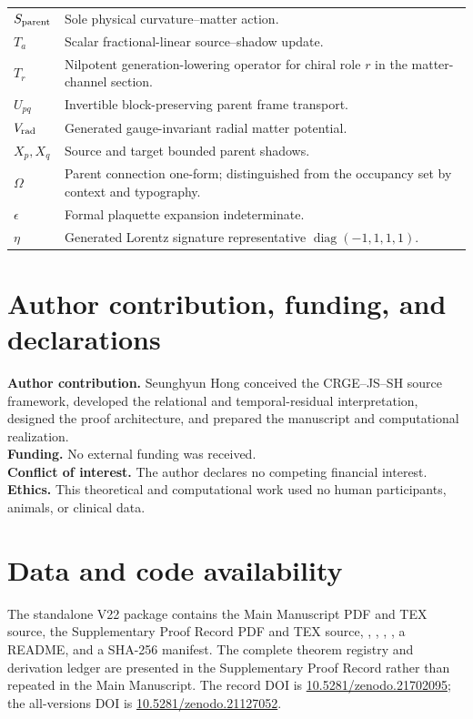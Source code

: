 \documentclass[11pt]{article}
\numberwithin{equation}{section}
\theoremstyle{remark}
\newcommand{\doi}[1]{\href{https://doi.org/#1}{#1}}
\begin{document}
\begin{longtable}{p{2.4cm}p{11.8cm}}
$S_{\rm parent}$&Sole physical curvature--matter action.\\
$T_a$&Scalar fractional-linear source--shadow update.\\
$T_r$&Nilpotent generation-lowering operator for chiral role $r$ in the matter-channel section.\\
$U_{pq}$&Invertible block-preserving parent frame transport.\\
$V_{\rm rad}$&Generated gauge-invariant radial matter potential.\\
$X_p,X_q$&Source and target bounded parent shadows.\\
$\Omega$&Parent connection one-form; distinguished from the occupancy set by context and typography.\\
$\epsilon$&Formal plaquette expansion indeterminate.\\
$\eta$&Generated Lorentz signature representative $\operatorname{diag}(-1,1,1,1)$.\\
\bottomrule
\end{longtable}

\section{Author contribution, funding, and declarations}
\textbf{Author contribution.} Seunghyun Hong conceived the CRGE--JS--SH source framework, developed the relational and temporal-residual interpretation, designed the proof architecture, and prepared the manuscript and computational realization.\\
\textbf{Funding.} No external funding was received.\\
\textbf{Conflict of interest.} The author declares no competing financial interest.\\
\textbf{Ethics.} This theoretical and computational work used no human participants, animals, or clinical data.

\section{Data and code availability}
The standalone V22 package contains the Main Manuscript PDF and TEX source, the Supplementary Proof Record PDF and TEX source, , , , , a README, and a SHA-256 manifest. The complete theorem registry and derivation ledger are presented in the Supplementary Proof Record rather than repeated in the Main Manuscript. The record DOI is \doi{10.5281/zenodo.21702095}; the all-versions DOI is \doi{10.5281/zenodo.21127052}.
\end{document}
